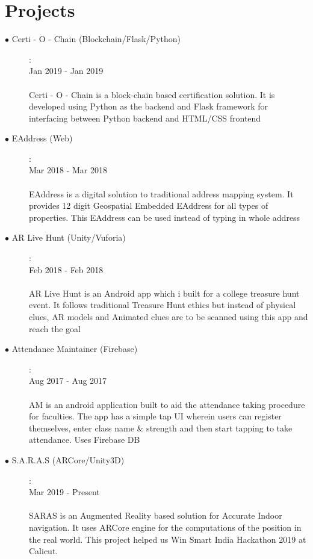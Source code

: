 \documentclass[11pt]{article}
\begin{document}
\section{Projects}
\begin{description}
    \item[$\bullet$ Certi - O - Chain (Blockchain/Flask/Python)]:
    \\Jan 2019 - Jan 2019
    \\\\Certi - O - Chain is a block-chain based certification solution. It is developed using Python as the backend and Flask framework for interfacing between Python backend and HTML/CSS frontend
    \item[$\bullet$ EAddress (Web)]:
    \\Mar 2018 - Mar 2018
    \\\\EAddress is a digital solution to traditional address mapping system. It provides 12 digit Geospatial Embedded EAddress for all types of properties. This EAddress can be used instead of typing in whole address
\item[$\bullet$ AR Live Hunt (Unity/Vuforia) ]:
\\Feb 2018 - Feb 2018
    \\\\AR Live Hunt is an Android app which i built for a college treasure hunt event. It follows traditional Treasure Hunt ethics but instead of physical clues, AR models and Animated clues are to be scanned using this app and reach the goal 
    \item[$\bullet$ Attendance Maintainer (Firebase) ]:
    \\Aug 2017 - Aug 2017
    \\\\AM is an android application built to aid the attendance taking procedure for faculties. The app has a simple tap UI wherein users can register themselves, enter class name \& strength and then start tapping to take attendance. Uses Firebase DB
    \item[$\bullet$ S.A.R.A.S (ARCore/Unity3D) ]:
    \\Mar 2019 - Present
    \\\\SARAS is an Augmented Reality based solution for Accurate Indoor navigation. It uses ARCore engine for the computations of the position in the real world. This project helped us Win Smart India Hackathon 2019 at Calicut.


\end{description}
\end{document}

